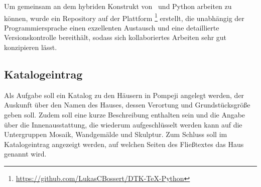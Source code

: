 \documentclass[ngerman]{dtk}
\begin{document}
Um gemeinsam an dem hybriden Konstrukt von \XeLaTeX\ und Python arbeiten zu können, wurde ein Repository auf der 
Plattform \footnote{\url{https://github.com/LukasCBossert/DTK-TeX-Python}} erstellt, 
die unabhängig der Programmiersprache einen exzellenten Austausch und eine detaillierte Versionskontrolle bereithält,
sodass sich kollaboriertes Arbeiten  sehr gut konzipieren lässt. 


\subsection{Katalogeintrag}
Als Aufgabe soll ein Katalog zu den Häusern in Pompeji angelegt werden,
der Auskunft über den Namen des Hauses, dessen Verortung und Grundstücksgröße  geben soll.
Zudem soll eine kurze Beschreibung enthalten sein und die Angabe über die Innenausstattung, 
die wiederum aufgeschlüsselt werden kann auf die Untergruppen Mosaik, Wandgemälde und Skulptur. 
Zum Schluss soll im Katalogeintrag angezeigt werden, 
auf welchen Seiten des Fließtextes das Haus genannt wird.
\end{document}
